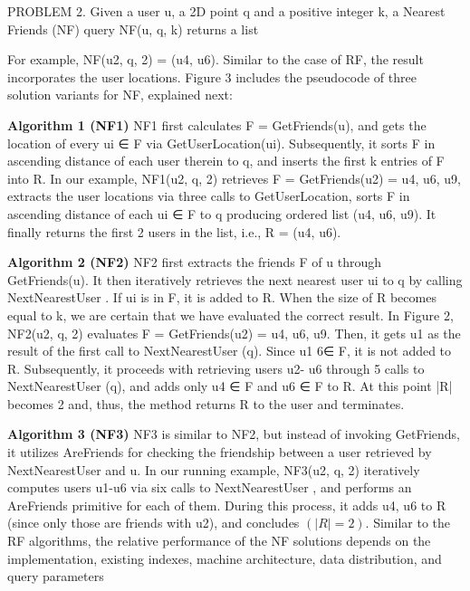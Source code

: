 \documentclass[prodmode,acmtods]{acmsmall} %
\begin{document}
PROBLEM 2. Given a user u, a 2D point q and a positive integer
k, a Nearest Friends (NF) query NF(u, q, k) returns a list

For example, NF(u2, q, 2) = (u4, u6). Similar to the case of
RF, the result incorporates the user locations. Figure 3 includes the
pseudocode of three solution variants for NF, explained next:

\textbf{Algorithm 1 (NF1)}
NF1 first calculates F = GetFriends(u),
and gets the location of every ui ∈ F via GetUserLocation(ui).
Subsequently, it sorts F in ascending distance of each user therein
to q, and inserts the first k entries of F into R. In our example,
NF1(u2, q, 2) retrieves F = GetFriends(u2) = {u4, u6, u9},
extracts the user locations via three calls to GetUserLocation,
sorts F in ascending distance of each ui ∈ F to q producing ordered
list (u4, u6, u9). It finally returns the first 2 users in the list,
i.e., R = (u4, u6).

\textbf{Algorithm 2 (NF2)}
 NF2 first extracts the friends F of u through
GetFriends(u). It then iteratively retrieves the next nearest user ui
to q by calling NextNearestUser . If ui is in F, it is added to R.
When the size of R becomes equal to k, we are certain that we have
evaluated the correct result. In Figure 2, NF2(u2, q, 2) evaluates
F = GetFriends(u2) = {u4, u6, u9}. Then, it gets u1 as the
result of the first call to NextNearestUser (q). Since u1 6∈ F, it is
not added to R. Subsequently, it proceeds with retrieving users u2-
u6 through 5 calls to NextNearestUser (q), and adds only u4 ∈ F
and u6 ∈ F to R. At this point |R| becomes 2 and, thus, the
method returns R to the user and terminates.

\textbf{Algorithm 3 (NF3)}
NF3 is similar to NF2, but instead of invoking
GetFriends, it utilizes AreFriends for checking the friendship
between a user retrieved by NextNearestUser and u. In our running
example, NF3(u2, q, 2) iteratively computes users u1-u6 via
six calls to NextNearestUser , and performs an AreFriends primitive
for each of them. During this process, it adds u4, u6 to R
(since only those are friends with u2), and concludes $(|R| = 2)$.
Similar to the RF algorithms, the relative performance of the
NF solutions depends on the implementation, existing indexes, machine
architecture, data distribution, and query parameters
\end{document}
